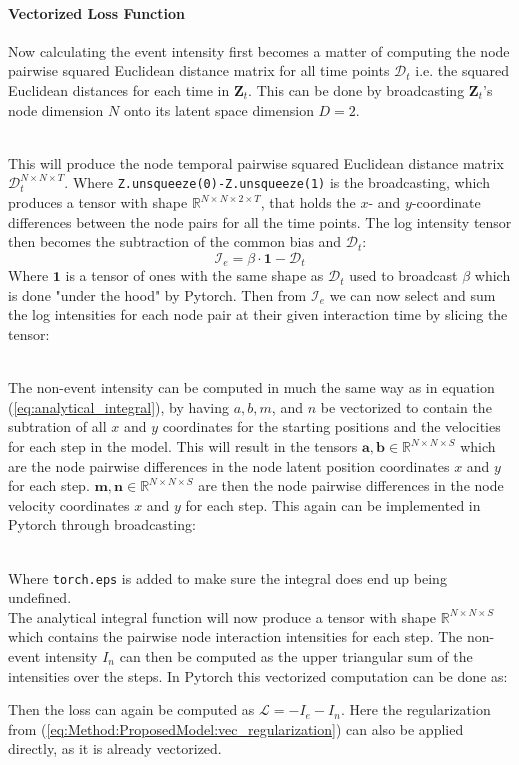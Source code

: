 \paragraph{Vectorized Loss Function}
Now calculating the event intensity first becomes a matter of computing the node pairwise squared Euclidean distance matrix for all time points $\boldsymbol{\mathcal{D}}_t$ i.e. the squared Euclidean distances for each time in $\textbf{Z}_t$. This can be done by broadcasting $\textbf{Z}_t$'s node dimension $N$ onto its latent space dimension $D=2$.

\\
This will produce the node temporal pairwise squared Euclidean distance matrix $\boldsymbol{\mathcal{D}}_t^{N \times N \times T}$.
Where \texttt{Z.unsqueeze(0)-Z.unsqueeze(1)} is the broadcasting, which produces a tensor with shape $\mathbb{R}^{N \times N \times 2 \times T}$, that holds the $x$- and $y$-coordinate differences between the node pairs for all the time points. 
The log intensity tensor then becomes the subtraction of the common bias and $\boldsymbol{\mathcal{D}}_t$:
\begin{equation}
    \boldsymbol{\mathcal{I}}_e = \beta \cdot \textbf{1} - \boldsymbol{\mathcal{D}}_t
\end{equation}
Where $\textbf{1}$ is a tensor of ones with the same shape as $\boldsymbol{\mathcal{D}}_t$ used to broadcast $\beta$ which is done "under the hood" by Pytorch. Then from $\boldsymbol{\mathcal{I}}_e$ we can now select and sum the log intensities for each node pair at their given interaction time by slicing the tensor:

\\
The non-event intensity can be computed in much the same way as in equation (\ref{eq:analytical_integral}), by having $a, b, m$, and $n$ be vectorized to contain the subtration of all $x$ and $y$ coordinates for the starting positions and the velocities for each step in the model. This will result in the tensors $\textbf{a}, \textbf{b} \in \mathbb{R}^{N \times N \times S}$ which are the node pairwise differences in the node latent position coordinates $x$ and $y$ for each step. $\textbf{m}, \textbf{n} \in \mathbb{R}^{N \times N \times S}$ are then the node pairwise differences in the node velocity coordinates $x$ and $y$ for each step. This again can be implemented in Pytorch through broadcasting: 


\\
Where \texttt{torch.eps} is added to make sure the integral does end up being undefined.
\\
The analytical integral function will now produce a tensor with shape $\mathbb{R}^{N \times N \times S}$ which contains the pairwise node interaction intensities for each step. The non-event intensity $I_n$ can then be computed as the upper triangular sum of the intensities over the steps. In Pytorch this vectorized computation can be done as:


\noindent
Then the loss can again be computed as $\mathcal{L} = - I_e - I_n$. Here the regularization from (\ref{eq:Method:ProposedModel:vec_regularization}) can also be applied directly, as it is already vectorized.